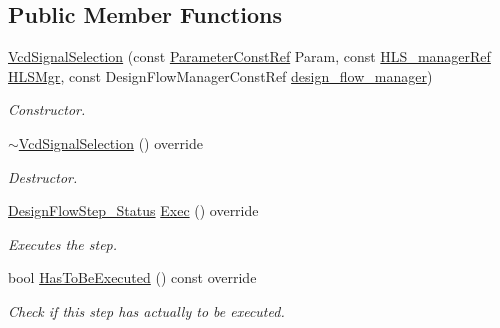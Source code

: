 \subsection*{Public Member Functions}
\begin{DoxyCompactItemize}
\item 
\hyperlink{classVcdSignalSelection_ae5930280205726a0f940b7fd2a4801bc}{Vcd\+Signal\+Selection} (const \hyperlink{Parameter_8hpp_a37841774a6fcb479b597fdf8955eb4ea}{Parameter\+Const\+Ref} Param, const \hyperlink{hls__manager_8hpp_acd3842b8589fe52c08fc0b2fcc813bfe}{H\+L\+S\+\_\+manager\+Ref} \hyperlink{classHLS__step_ade85003a99d34134418451ddc46a18e9}{H\+L\+S\+Mgr}, const Design\+Flow\+Manager\+Const\+Ref \hyperlink{classDesignFlowStep_ab770677ddf087613add30024e16a5554}{design\+\_\+flow\+\_\+manager})
\begin{DoxyCompactList}\small\item\em Constructor. \end{DoxyCompactList}\item 
\hyperlink{classVcdSignalSelection_af3b73d8ddec404bf3909f58ece570b79}{$\sim$\+Vcd\+Signal\+Selection} () override
\begin{DoxyCompactList}\small\item\em Destructor. \end{DoxyCompactList}\item 
\hyperlink{design__flow__step_8hpp_afb1f0d73069c26076b8d31dbc8ebecdf}{Design\+Flow\+Step\+\_\+\+Status} \hyperlink{classVcdSignalSelection_a330bc0d127f30a23cb4c8224855f0c27}{Exec} () override
\begin{DoxyCompactList}\small\item\em Executes the step. \end{DoxyCompactList}\item 
bool \hyperlink{classVcdSignalSelection_afa06729c43cc2aa50e1fb3ed25d5b239}{Has\+To\+Be\+Executed} () const override
\begin{DoxyCompactList}\small\item\em Check if this step has actually to be executed. \end{DoxyCompactList}\end{DoxyCompactItemize}
